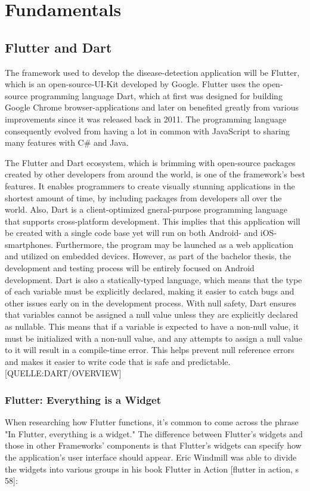 

\chapter{Fundamentals}
\section{Flutter and Dart}
The framework used to develop the disease-detection application will be Flutter, which is an open-source-UI-Kit developed by Google. Flutter uses the open-source programming language Dart, which at first was designed for building Google Chrome browser-applications and later on benefited greatly from various improvements since it was released back in 2011. The programming language consequently evolved from having a lot in common with JavaScript to sharing many features with C\# and Java.

The Flutter and Dart ecosystem, which is brimming with open-source packages created by other developers from around the world, is one of the framework's best features. It enables programmers to create visually stunning applications in the shortest amount of time, by including packages from developers all over the world. Also, Dart is a client-optimized gneral-purpose programming language that supports cross-platform development. This implies that this application will be created with a single code base yet will run on both Android- and iOS-smartphones. Furthermore, the program may be launched as a web application and utilized on embedded devices. However, as part of the bachelor thesis, the development and testing process will be entirely focused on Android development. Dart is also a statically-typed language, which means that the type of each variable must be explicitly declared, making it easier to catch bugs and other issues early on in the development process. With null safety, Dart ensures that variables cannot be assigned a null value unless they are explicitly declared as nullable. This means that if a variable is expected to have a non-null value, it must be initialized with a non-null value, and any attempts to assign a null value to it will result in a compile-time error. This helps prevent null reference errors and makes it easier to write code that is safe and predictable. [QUELLE:DART/OVERVIEW]

\subsection{Flutter: Everything is a Widget}
When researching how Flutter functions, it's common to come across the phrase "In Flutter, everything is a widget." The difference between Flutter's widgets and those in other Frameworks' components is that Flutter's widgets can specify how the application's user interface should appear. Eric Windmill was able to divide the widgets into various groups in his book Flutter in Action [flutter in action, s 58]:

